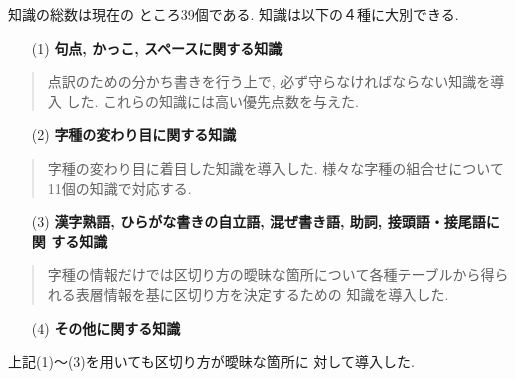 知識の総数は現在の
ところ39個である. 知識は以下の４種に大別できる. 
\begin{enumerate}
\item[(1)] {\bf 句点, かっこ, スペースに関する知識}
\end{enumerate}

\begin{quote}
\vspace{0.3cm}
\begin{flushleft}
点訳のための分かち書きを行う上で, 必ず守らなければならない知識を導入
した. これらの知識には高い優先点数を与えた. 
\end{flushleft}
\vspace{0.3cm}
\end{quote}

\begin{enumerate}

\item[(2)] {\bf 字種の変わり目に関する知識}
\end{enumerate}
\vspace{0.3cm}

\begin{quote}
\begin{flushleft}
字種の変わり目に着目した知識を導入した. 
様々な字種の組合せについて11個の知識で対応する. 
\end{flushleft}
\end{quote}
\vspace{0.3cm}
\begin{enumerate}

\item[(3)] {\bf 漢字熟語, ひらがな書きの自立語, 混ぜ書き語, 助詞, 接頭語・接尾語に関
する知識}
\end{enumerate}
\vspace{0.3cm}

\begin{quote}
\begin{flushleft}
字種の情報だけでは区切り方の曖昧な箇所について各種テーブルから得られる表層情報を基に区切り方を決定するための
知識を導入した. 
\end{flushleft}
\end{quote}
\vspace{0.3cm}

\begin{enumerate}
\item[(4)] {\bf その他に関する知識} 
\end{enumerate}
\vspace{0.3cm}
上記(1)〜(3)を用いても区切り方が曖昧な箇所に
対して導入した. 

